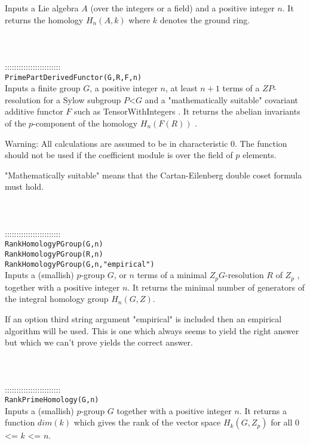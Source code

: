 \documentclass[a4paper,11pt]{report}
\begin{document}
{ Inputs a Lie algebra $A$ (over the integers or a field) and a positive integer $n$. It returns the homology $H_n(A,k)$ where $k$ denotes the ground ring. \\
 \\
 \\
 \\
 ::::::::::::::::::::::::\\
 \texttt{PrimePartDerivedFunctor(G,R,F,n)}\\
 

 Inputs a finite group $G$, a positive integer $n$, at least $n+1$ terms of a $ZP$-resolution for a Sylow subgroup $P${\textless}$G$ and a "mathematically suitable" covariant additive functor $F$ such as TensorWithIntegers . It returns the abelian invariants of the $p$-component of the homology $H_n(F(R))$ . 

 Warning: All calculations are assumed to be in characteristic 0. The function
should not be used if the coefficient module is over the field of $p$ elements. 

 "Mathematically suitable" means that the Cartan-Eilenberg double coset formula
must hold. \\
 \\
 \\
 \\
 ::::::::::::::::::::::::\\
 \texttt{RankHomologyPGroup(G,n)}\\
 \texttt{RankHomologyPGroup(R,n)}\\
 \texttt{RankHomologyPGroup(G,n,"empirical")}\\
 

 Inputs a (smallish) $p$-group $G$, or $n$ terms of a minimal $Z_pG$-resolution $R$ of $Z_p$ , together with a positive integer $n$. It returns the minimal number of generators of the integral homology group $H_n(G,Z)$. 

 If an option third string argument "empirical" is included then an empirical
algorithm will be used. This is one which always seems to yield the right
answer but which we can't prove yields the correct answer. \\
 \\
 \\
 \\
 ::::::::::::::::::::::::\\
 \texttt{RankPrimeHomology(G,n)}\\
 

 Inputs a (smallish) $p$-group $G$ together with a positive integer $n$. It returns a function $dim(k)$ which gives the rank of the vector space $H_k(G,Z_p)$ for all $0$ {\textless}= $k$ {\textless}= $n$. \\
 \\
 \\
 }
\end{document}
